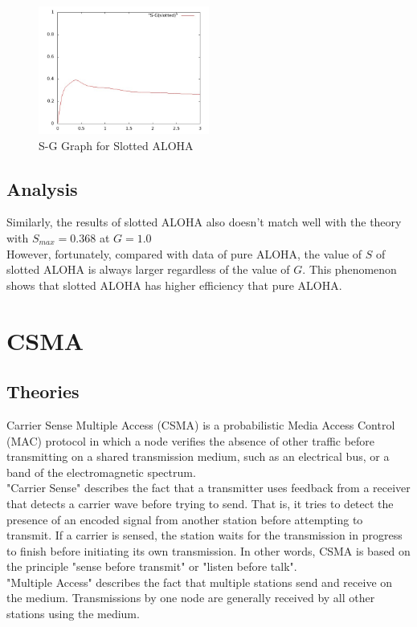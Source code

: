 \documentclass[11pt,a4paper]{report}
\begin{document}
\begin{figure}
\centering
\includegraphics[width=0.5\textwidth]{2_2.jpg}
\caption{S-G Graph for Slotted ALOHA}
\end{figure}

\subsection*{Analysis}
Similarly, the results of slotted ALOHA also doesn't match well with the theory with \(S_{max} = 0.368\) at \(G = 1.0\) \\

However, fortunately, compared with data of pure ALOHA, the value of \(S\) of slotted ALOHA is always larger regardless of the value of \(G\). This phenomenon shows that slotted ALOHA has higher efficiency that pure ALOHA.



\section*{CSMA}
\subsection*{Theories}
Carrier Sense Multiple Access (CSMA) is a probabilistic Media Access Control (MAC) protocol in which a node verifies the absence of other traffic before transmitting on a shared transmission medium, such as an electrical bus, or a band of the electromagnetic spectrum. \\

"Carrier Sense" describes the fact that a transmitter uses feedback from a receiver that detects a carrier wave before trying to send. That is, it tries to detect the presence of an encoded signal from another station before attempting to transmit. If a carrier is sensed, the station waits for the transmission in progress to finish before initiating its own transmission. In other words, CSMA is based on the principle "sense before transmit" or "listen before talk". \\
"Multiple Access" describes the fact that multiple stations send and receive on the medium. Transmissions by one node are generally received by all other stations using the medium. \\
\end{document}
